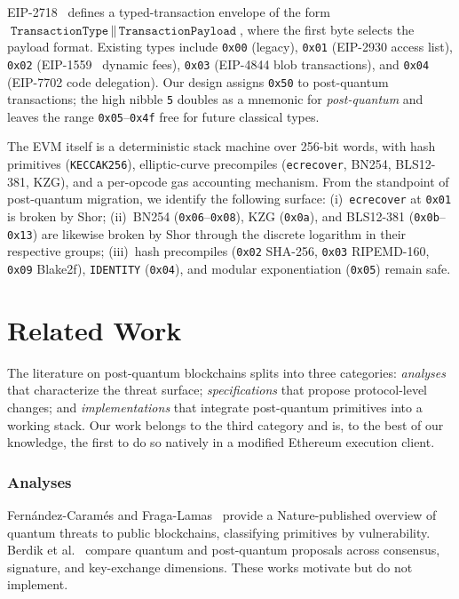 \documentclass[journal,onecolumn,11pt]{IEEEtran}
\begin{document}
EIP-2718~\cite{eip2718} defines a typed-transaction envelope of the form $\texttt{TransactionType} \,\|\, \texttt{TransactionPayload}$, where the first byte selects the payload format. Existing types include \texttt{0x00} (legacy), \texttt{0x01} (EIP-2930 access list), \texttt{0x02} (EIP-1559~\cite{eip1559} dynamic fees), \texttt{0x03} (EIP-4844 blob transactions), and \texttt{0x04} (EIP-7702 code delegation). Our design assigns \texttt{0x50} to post-quantum transactions; the high nibble \texttt{5} doubles as a mnemonic for \emph{post-quantum} and leaves the range \texttt{0x05}--\texttt{0x4f} free for future classical types.

The EVM itself is a deterministic stack machine over 256-bit words, with hash primitives (\texttt{KECCAK256}), elliptic-curve precompiles (\texttt{ecrecover}, BN254, BLS12-381, KZG), and a per-opcode gas accounting mechanism. From the standpoint of post-quantum migration, we identify the following surface: (i)~\texttt{ecrecover} at \texttt{0x01} is broken by Shor; (ii)~BN254 (\texttt{0x06}--\texttt{0x08}), KZG (\texttt{0x0a}), and BLS12-381 (\texttt{0x0b}--\texttt{0x13}) are likewise broken by Shor through the discrete logarithm in their respective groups; (iii)~hash precompiles (\texttt{0x02} SHA-256, \texttt{0x03} RIPEMD-160, \texttt{0x09} Blake2f), \texttt{IDENTITY} (\texttt{0x04}), and modular exponentiation (\texttt{0x05}) remain safe.

\section{Related Work}
\label{sec:related}

The literature on post-quantum blockchains splits into three categories: \emph{analyses} that characterize the threat surface; \emph{specifications} that propose protocol-level changes; and \emph{implementations} that integrate post-quantum primitives into a working stack. Our work belongs to the third category and is, to the best of our knowledge, the first to do so natively in a modified Ethereum execution client.

\subsubsection*{Analyses} Fern\'andez-Caram\'es and Fraga-Lamas~\cite{quantumresistance2023} provide a Nature-published overview of quantum threats to public blockchains, classifying primitives by vulnerability. Berdik et al.~\cite{berdik2023survey} compare quantum and post-quantum proposals across consensus, signature, and key-exchange dimensions. These works motivate but do not implement.
\end{document}
